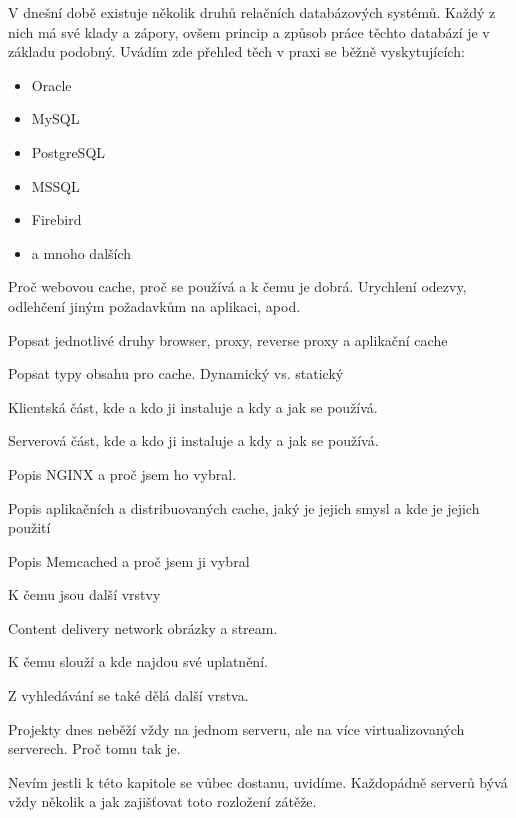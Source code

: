 \documentclass[12pt]{article}
\begin{document}
V dnešní době existuje několik druhů relačních databázových systémů. Každý z nich má své klady a zápory, ovšem princip a způsob práce těchto databází je v základu podobný. Uvádím zde přehled těch v praxi se běžně vyskytujících:

\begin{itemize}
\item Oracle
\item MySQL
\item PostgreSQL
\item MSSQL
\item Firebird
\item a mnoho dalších
\end{itemize}



Proč webovou cache, proč se používá a k čemu je dobrá. Urychlení odezvy, odlehčení jiným požadavkům na aplikaci, apod.

Popsat jednotlivé druhy browser, proxy, reverse proxy a aplikační cache

Popsat typy obsahu pro cache. Dynamický vs. statický

Klientská část, kde a kdo ji instaluje a kdy a jak se používá.

Serverová část, kde a kdo ji instaluje a kdy a jak se používá.

Popis NGINX a proč jsem ho vybral.

Popis aplikačních a distribuovaných cache, jaký je jejich smysl a kde je jejich použití

Popis Memcached a proč jsem ji vybral


K čemu jsou další vrstvy

Content delivery network obrázky a stream.

K čemu slouží a kde najdou své uplatnění.

Z vyhledávání se také dělá další vrstva.



Projekty dnes neběží vždy na jednom serveru, ale na více virtualizovaných serverech. Proč tomu tak je.


Nevím jestli k této kapitole se vůbec dostanu, uvidíme. Každopádně serverů bývá vždy několik a jak zajišťovat toto rozložení zátěže.
\end{document}
